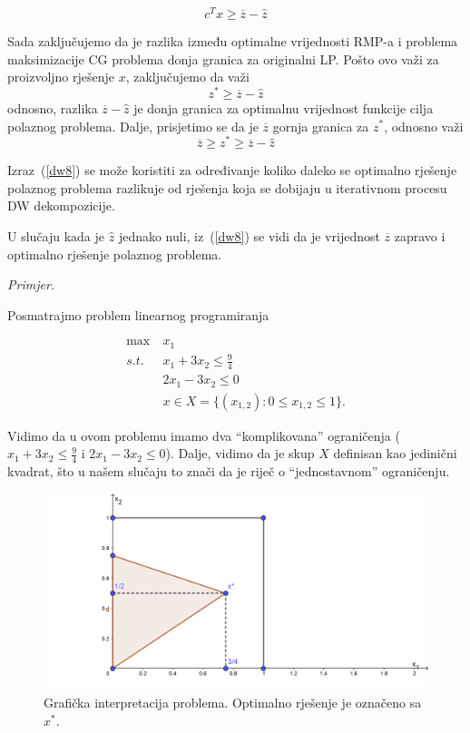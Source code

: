 \documentclass[a4paper, utf8, 11pt, colorlinks]{book}
\begin{document}
 $$ c^Tx\geqslant \overline{z}-\hat{z}$$
 
 Sada zaključujemo da je razlika između optimalne vrijednosti RMP-a i problema maksimizacije CG  problema donja granica za originalni LP. Pošto ovo važi za proizvoljno rješenje $x$, zaključujemo da važi 
 $$z^*\geqslant \overline{z}-\hat{z}$$
 odnosno, razlika $\overline{z}-\hat{z}$ je donja granica za optimalnu vrijednost funkcije cilja polaznog problema. Dalje, prisjetimo se da je $\overline{z}$ gornja granica za $z^*$, odnosno važi 
\begin{equation}\label{dw8}
	  \overline{z}\geqslant z^*\geqslant \overline{z}-\hat{z}
\end{equation}
 
 Izraz~(\ref{dw8}) se može koristiti za određivanje koliko daleko se optimalno rješenje polaznog problema razlikuje od rješenja koja se dobijaju u iterativnom procesu DW dekompozicije.
 
 U slučaju kada je $\hat{z}$ jednako nuli, iz~(\ref{dw8}) se vidi da je vrijednost $\overline{z}$ zapravo i optimalno rješenje polaznog problema.
 
 \emph{Primjer.}%
 
 Posmatrajmo problem linearnog programiranja
 
   \begin{equation}
 	\begin{aligned}\label{primjer:dw1}
 		\max\  &x_1\\
 		s.t.\  &x_1+3x_2\leqslant \frac94\\
 		 &2x_1-3x_2\leqslant 0\\
 		&x \in X=\{(x_{1,2}):0\leqslant x_{1, 2}  \leqslant 1\}.
 	\end{aligned}
 \end{equation}
 
 Vidimo da u ovom problemu imamo dva ``komplikovana'' ograničenja ($x_1+3x_2\leqslant \frac94$ i
 $2x_1-3x_2\leqslant 0$). Dalje, vidimo da je skup $X$ definisan kao jedinični kvadrat, što u našem slučaju to znači da je riječ o ``jednostavnom'' ograničenju. 
 
 \begin{figure}\label{fig:dw1}
 	
 	\includegraphics[scale=4]{dw2.png}
 	\caption{Grafička interpretacija problema. Optimalno rješenje je označeno sa $x^*$. }
 	\label{fig:dw1}
 \end{figure}
 
\end{document}
